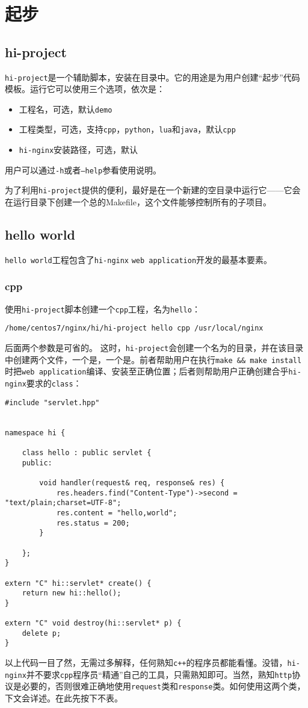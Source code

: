 \section{起步}
\subsection{hi-project}
\texttt{hi-project}是一个辅助脚本，安装在目录中。它的用途是为用户创建“起步”代码模板。运行它可以使用三个选项，依次是：
\begin{itemize}
\item 工程名，可选，默认\texttt{demo}
\item 工程类型，可选，支持\texttt{cpp}，\texttt{python}，\texttt{lua}和\texttt{java}，默认\texttt{cpp}
\item \texttt{hi-nginx}安装路径，可选，默认
\end{itemize}
用户可以通过\texttt{-h}或者\texttt{--help}参看使用说明。

为了利用\texttt{hi-project}提供的便利，最好是在一个新建的空目录中运行它——它会在运行目录下创建一个总的Makefile，这个文件能够控制所有的子项目。

\subsection{hello world}
\texttt{hello world}工程包含了\texttt{hi-nginx} \texttt{web application}开发的最基本要素。
\subsubsection{cpp}
使用\texttt{hi-project}脚本创建一个\texttt{cpp}工程，名为\texttt{hello}：
\begin{lstlisting}
/home/centos7/nginx/hi/hi-project hello cpp /usr/local/nginx
\end{lstlisting}
后面两个参数是可省的。
这时，\texttt{hi-project}会创建一个名为的目录，并在该目录中创建两个文件，一个是，一个是。前者帮助用户在执行\texttt{make \&\& make install }时把\texttt{web application}编译、安装至正确位置；后者则帮助用户正确创建合乎\texttt{hi-nginx}要求的\texttt{class}：
\begin{lstlisting}
#include "servlet.hpp"


namespace hi {

    class hello : public servlet {
    public:

        void handler(request& req, response& res) {
            res.headers.find("Content-Type")->second = "text/plain;charset=UTF-8";
            res.content = "hello,world";
            res.status = 200;
        }

    };
}

extern "C" hi::servlet* create() {
    return new hi::hello();
}

extern "C" void destroy(hi::servlet* p) {
    delete p;
}
\end{lstlisting}
以上代码一目了然，无需过多解释，任何熟知\texttt{c++}的程序员都能看懂。没错，\texttt{hi-nginx}并不要求\texttt{cpp}程序员“精通”自己的工具，只需熟知即可。当然，熟知\texttt{http}协议是必要的，否则很难正确地使用\texttt{request}类和\texttt{response}类。如何使用这两个类，下文会详述。在此先按下不表。

